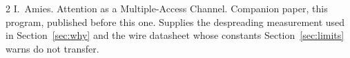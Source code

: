 \documentclass[10pt,twocolumn]{article}
\begin{document}
\begin{thebibliography}{2}\small
{} I.~Amies. Attention as a Multiple-Access Channel. Companion paper,
this program, published before this one. Supplies the despreading measurement used in
Section~\ref{sec:why} and the wire datasheet whose constants Section~\ref{sec:limits}
warns do not transfer.
\end{thebibliography}
\end{document}
